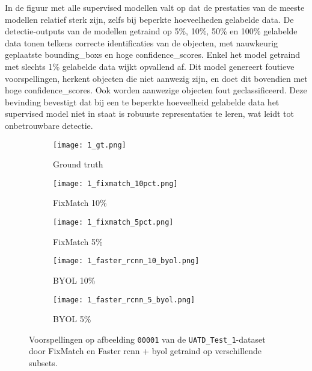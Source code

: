 In de figuur met alle supervised modellen valt op dat de prestaties van de meeste modellen relatief sterk zijn, zelfs bij beperkte hoeveelheden gelabelde data. De detectie-outputs van de modellen getraind op 5\%, 10\%, 50\% en 100\% gelabelde data tonen telkens correcte identificaties van de objecten, met nauwkeurig geplaatste \glspl{bounding_box} en hoge \glspl{confidence_score}. Enkel het model getraind met slechts 1\% gelabelde data wijkt opvallend af. Dit model genereert foutieve voorspellingen, herkent objecten die niet aanwezig zijn, en doet dit bovendien met hoge \glspl{confidence_score}. Ook worden aanwezige objecten fout geclassificeerd. Deze bevinding bevestigt dat bij een te beperkte hoeveelheid gelabelde data het supervised model niet in staat is robuuste representaties te leren, wat leidt tot onbetrouwbare detectie.

\begin{figure}[H]
    \centering
    \begin{subfigure}{.2\textwidth}
        \centering
        \captionsetup{justification=centering}
        \texttt{[image: 1\_gt.png]}
        \caption[Ground truth]{Ground truth}
        \label{fig:ground_truth_}
    \end{subfigure}%
    \begin{subfigure}{.2\textwidth}
        \centering
        \captionsetup{justification=centering}
        \texttt{[image: 1\_fixmatch\_10pct.png]}
        \caption[Voorspelling FixMatch 10\%]{FixMatch 10\%}
        \label{fig:faster_rcnn_5_prediction}
    \end{subfigure}%
    \begin{subfigure}{.2\textwidth}
        \centering
        \captionsetup{justification=centering}
        \texttt{[image: 1\_fixmatch\_5pct.png]}
        \caption[Voorspelling FixMatch 5\%]{FixMatch 5\%}
        \label{fig:faster_rcnn_10_prediction}
    \end{subfigure}%
    \begin{subfigure}{.2\textwidth}
        \centering
        \captionsetup{justification=centering}
        \texttt{[image: 1\_faster\_rcnn\_10\_byol.png]}
        \caption[Voorspelling BYOL 10\%]{BYOL 10\%}
        \label{fig:faster_rcnn_50_prediction}
    \end{subfigure}%
    \begin{subfigure}{.2\textwidth}
        \centering
        \captionsetup{justification=centering}
        \texttt{[image: 1\_faster\_rcnn\_5\_byol.png]}
        \caption[Voorspelling BYOL 5\%]{BYOL 5\%}
    \end{subfigure}%
    \caption[Voorspellingen door semi- en self-supervised modellen.]{Voorspellingen op afbeelding \texttt{00001} van de \texttt{UATD\_Test\_1}-dataset door FixMatch en Faster \gls{rcnn} + \gls{byol} getraind op verschillende subsets.}
    \label{fig:supervised_predictions}
\end{figure}

